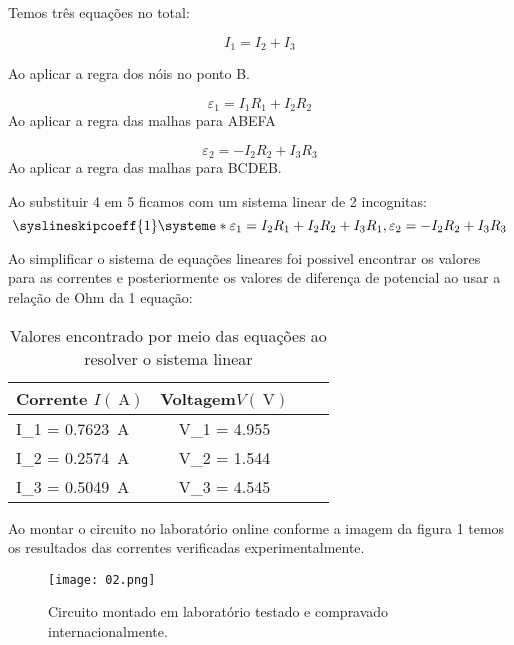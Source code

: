 \documentclass[14pt,twocolumn ]{article}
\begin{document}
Temos três equações no total: 



\begin{equation}
\label{eq:resist}
     I_{1}=I_{2}+I_{3} 
\end{equation}

Ao aplicar a regra dos nóis no ponto B.


\begin{equation}
\label{eq:resist}
\varepsilon_{1}=I_{1} R_{1}+I_{2} R_{2}
\end{equation}
Ao aplicar a regra das malhas para ABEFA


\begin{equation}
\label{eq:resist}
\varepsilon_{2}=-I_{2} R_{2}+I_{3} R_{3}
\end{equation}
Ao aplicar a regra das malhas para BCDEB. 



Ao substituir 4 em 5 ficamos com um sistema linear de 2 incognitas:
\[
\syslineskipcoeff{1}
\systeme*{\varepsilon_{1}= I_{2}R_1 + I_{2} R_2 + I_{3}R_1, \varepsilon_{2}= -I_{2}R_2 + I_{3}R_3}
\]

Ao simplificar o sistema de equações lineares foi possivel encontrar os valores para as correntes e posteriormente os valores de diferença de potencial ao usar a relação de Ohm da 1 equação:

\begin{table}[ht]
\centering
\caption{Valores encontrado por meio das equações ao resolver o sistema linear}
\begin{tabular}[t]{lccr}
\toprule
Corrente $I (\SI{}{\ampere})$    & Voltagem$V(\SI{}{\volt})$ \\
\midrule
I_1 = \SI{0.7623}{\ampere} & V_1 = 4.955 \\
I_2 = \SI{0.2574}{\ampere} & V_2 = 1.544 \\
I_3 = \SI{0.5049}{\ampere} & V_3 = 4.545 \\
    
\bottomrule
\end{tabular}
\end{table}%

Ao montar o circuito no laboratório online conforme a imagem da figura 1 temos os resultados das correntes verificadas experimentalmente.

\begin{figure}
     
      \texttt{[image: 02.png]}
    \caption{Circuito montado em laboratório testado e compravado internacionalmente.}
    \label{fig:my_label}
\end{figure}
\end{document}
